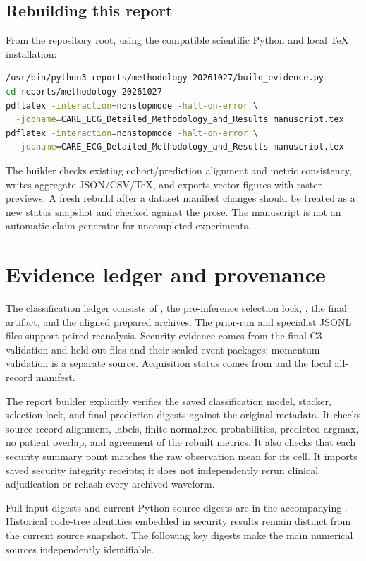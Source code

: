 \subsection{Rebuilding this report}
From the repository root, using the compatible scientific Python and local TeX installation:
\begin{lstlisting}[language=bash]
/usr/bin/python3 reports/methodology-20261027/build_evidence.py
cd reports/methodology-20261027
pdflatex -interaction=nonstopmode -halt-on-error \
  -jobname=CARE_ECG_Detailed_Methodology_and_Results manuscript.tex
pdflatex -interaction=nonstopmode -halt-on-error \
  -jobname=CARE_ECG_Detailed_Methodology_and_Results manuscript.tex
\end{lstlisting}
The builder checks existing cohort/prediction alignment and metric consistency, writes aggregate JSON/CSV/TeX, and exports vector figures with raster previews. A fresh rebuild after a dataset manifest changes should be treated as a new status snapshot and checked against the prose. The manuscript is not an automatic claim generator for uncompleted experiments.

\section{Evidence ledger and provenance}
\label{app:provenance}
The classification ledger consists of , the pre-inference selection lock, , the final artifact, and the aligned prepared archives. The prior-run and specialist JSONL files support paired reanalysis. Security evidence comes from the final C3 validation and held-out  files and their sealed event packages; momentum validation is a separate source. Acquisition status comes from  and the local all-record manifest.

The report builder explicitly verifies the saved classification model, stacker, selection-lock, and final-prediction digests against the original metadata. It checks source record alignment, labels, finite normalized probabilities, predicted argmax, no patient overlap, and agreement of the rebuilt metrics. It also checks that each security summary point matches the raw observation mean for its cell. It imports saved security integrity receipts; it does not independently rerun clinical adjudication or rehash every archived waveform.

Full input digests and current Python-source digests are in the accompanying \code{evidence.json}. Historical code-tree identities embedded in security results remain distinct from the current source snapshot. The following key digests make the main numerical sources independently identifiable.


